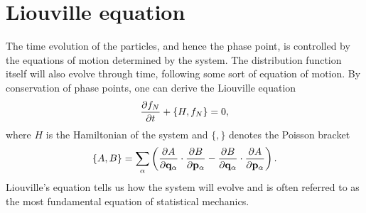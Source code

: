\section{Liouville equation}
The time evolution of the particles, and hence the phase point, is controlled by the equations of motion determined by the system. The distribution function itself will also evolve through time, following some sort of equation of motion. By conservation of phase points, one can derive the Liouville equation
\begin{align}
	\frac{\partial f_N}{\partial t} + \{H, f_N\} = 0,
\end{align}
where $H$ is the Hamiltonian of the system and $\{,\}$ denotes the Poisson bracket
\begin{align}
	\{A,B\} = \sum_\alpha\left( \frac{\partial A}{\partial \mathbf q_\alpha}\cdot\frac{\partial B}{\partial \mathbf p_\alpha} - \frac{\partial B}{\partial \mathbf q_\alpha}\cdot\frac{\partial A}{\partial \mathbf p_\alpha}\right).
\end{align}
 Liouville's equation tells us how the system will evolve and is often referred to as the most fundamental equation of statistical mechanics\cite{mcquarrie1973statistical}. 
